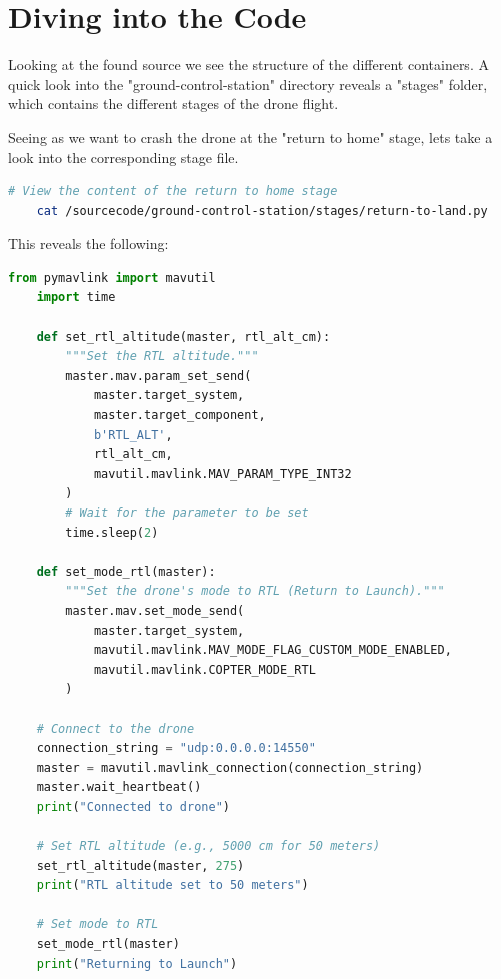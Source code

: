 \documentclass[12pt]{scrartcl}
\begin{document}
    \newpage

    \section{Diving into the Code}

    Looking at the found source we see the structure of the different containers. A quick look into the "ground-control-station" directory reveals a "stages" folder, which contains the different stages of the drone flight.

    Seeing as we want to crash the drone at the "return to home" stage, lets take a look into the corresponding stage file.

    \begin{lstlisting}[language=bash, caption=Viewing the return to home stage]
    # View the content of the return to home stage
    cat /sourcecode/ground-control-station/stages/return-to-land.py
    \end{lstlisting}

    This reveals the following:

    \begin{lstlisting}[language=python, caption=Content of return-to-land.py]
    from pymavlink import mavutil
    import time

    def set_rtl_altitude(master, rtl_alt_cm):
        """Set the RTL altitude."""
        master.mav.param_set_send(
            master.target_system,
            master.target_component,
            b'RTL_ALT',
            rtl_alt_cm,
            mavutil.mavlink.MAV_PARAM_TYPE_INT32
        )
        # Wait for the parameter to be set
        time.sleep(2)

    def set_mode_rtl(master):
        """Set the drone's mode to RTL (Return to Launch)."""
        master.mav.set_mode_send(
            master.target_system,
            mavutil.mavlink.MAV_MODE_FLAG_CUSTOM_MODE_ENABLED,
            mavutil.mavlink.COPTER_MODE_RTL
        )

    # Connect to the drone
    connection_string = "udp:0.0.0.0:14550"
    master = mavutil.mavlink_connection(connection_string)
    master.wait_heartbeat()
    print("Connected to drone")

    # Set RTL altitude (e.g., 5000 cm for 50 meters)
    set_rtl_altitude(master, 275)
    print("RTL altitude set to 50 meters")

    # Set mode to RTL
    set_mode_rtl(master)
    print("Returning to Launch")
    \end{lstlisting}
\end{document}
